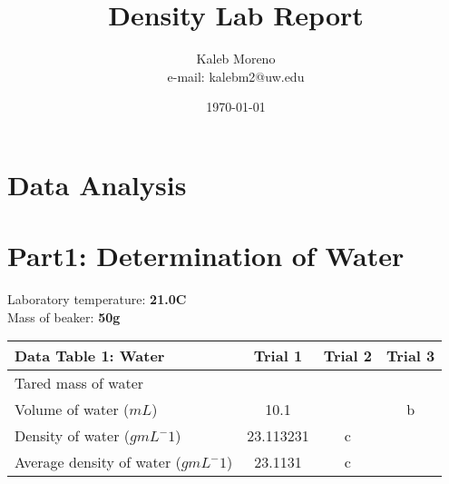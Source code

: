 \documentclass[a4paper,10pt]{article}
\begin{document}
    \title{Density Lab Report}

    \author{Kaleb Moreno \\ e-mail: kalebm2@uw.edu}
            
    \date{\today}

    \maketitle

    \newpage

    \tableofcontents
        
    \pagebreak
    \section*{Data Analysis}
    \section{Part1: Determination of Water}

        Laboratory temperature: \textbf{21.0\degree C}\\
        Mass of beaker: \textbf{50g}

        \begin{table}[h!]
            \label{tab:table1}
            \begin{tabular}{|l|c|c|c|}
                \hline
                \textbf{Data Table 1: Water} & \textbf{Trial 1} & \textbf{Trial 2} & \textbf{Trial 3}\\
                \hline
                Tared mass of water & & & \\
                \hline
                Volume of water ($mL$) & 10.1 & & b \\
                \hline
                Density of water ($g mL ^ -1$) & 23.113231 & c & \\
                \hline
                Average density of water ($g mL ^ -1$) & 23.1131 & c & \\
                \hline
            \end{tabular}
        \end{table}
\end{document}
